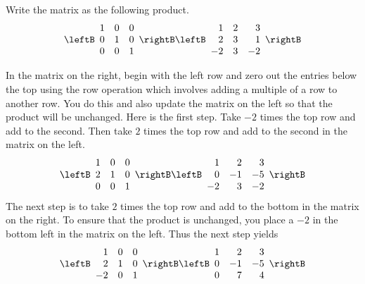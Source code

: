 \begin{solution}

Write the matrix as the following product.
\begin{equation*}
\leftB 
\begin{array}{rrr}
1 & 0 & 0 \\ 
0 & 1 & 0 \\ 
0 & 0 & 1
\end{array}
\rightB \leftB 
\begin{array}{rrr}
1 & 2 & 3 \\ 
2 & 3 & 1 \\ 
-2 & 3 & -2
\end{array}
\rightB
\end{equation*}

In the matrix on the right, begin with the left row and zero
out the entries below the top using the row operation which involves adding
a multiple of a row to another row. You do this and also update the matrix
on the left so that the product will be unchanged. Here is the first step.
Take $-2$ times the top row and add to the second. Then take $2$ times the
top row and add to the second in the matrix on the left. 
\begin{equation*}
\leftB 
\begin{array}{rrr}
1 & 0 & 0 \\ 
2 & 1 & 0 \\ 
0 & 0 & 1
\end{array}
\rightB \leftB 
\begin{array}{rrr}
1 & 2 & 3 \\ 
0 & -1 & -5 \\ 
-2 & 3 & -2
\end{array}
\rightB
\end{equation*}
The next step is to take $2$ times the top row and add to the bottom in the
matrix on the right. To ensure that the product is unchanged, you place a $%
-2 $ in the bottom left in the matrix on the left. Thus the next step yields 
\begin{equation*}
\leftB 
\begin{array}{rrr}
1 & 0 & 0 \\ 
2 & 1 & 0 \\ 
-2 & 0 & 1
\end{array}
\rightB \leftB 
\begin{array}{rrr}
1 & 2 & 3 \\ 
0 & -1 & -5 \\ 
0 & 7 & 4
\end{array}
\rightB
\end{equation*}

\end{solution}
